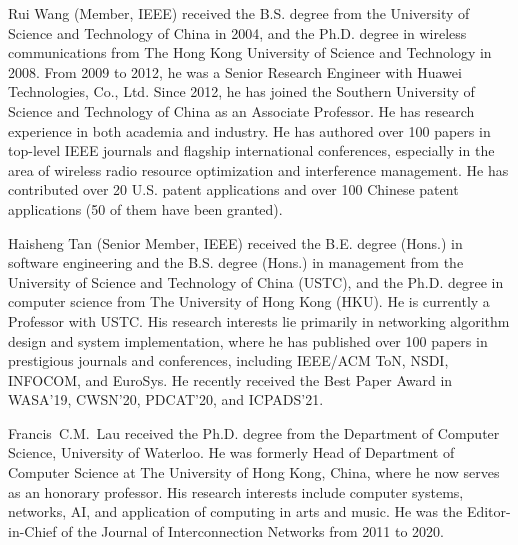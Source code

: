 \begin{IEEEbiography}{Rui Wang}
    (Member, IEEE) received the B.S. degree from the University of Science and Technology of China in 2004, and the Ph.D. degree in wireless communications from The Hong Kong University of Science and Technology in 2008.
	From 2009 to 2012, he was a Senior Research Engineer with Huawei Technologies, Co., Ltd.
	Since 2012, he has joined the Southern University of Science and Technology of China as an Associate Professor.
	He has research experience in both academia and industry.
	He has authored over 100 papers in top-level IEEE journals and flagship international conferences, especially in the area of wireless radio resource optimization and interference management.
	He has contributed over 20 U.S. patent applications and over 100 Chinese patent applications (50 of them have been granted).
\end{IEEEbiography}
\vspace{-1cm}

\begin{IEEEbiography}{Haisheng Tan}
    (Senior Member, IEEE) received the B.E. degree (Hons.) in software engineering and the B.S. degree (Hons.) in management from the University of Science and Technology of China (USTC), and the Ph.D. degree in computer science from The University of Hong Kong (HKU).
	He is currently a Professor with USTC.
	His research interests lie primarily in networking algorithm design and system implementation, where he has published over 100 papers in prestigious journals and conferences, including IEEE/ACM ToN, NSDI, INFOCOM, and EuroSys.
	He recently received the Best Paper Award in WASA'19, CWSN'20, PDCAT'20, and ICPADS'21.
\end{IEEEbiography}
\vspace{-1cm}

\begin{IEEEbiography}{Francis~C.M.~Lau}
    received the Ph.D. degree from the Department of Computer Science, University of Waterloo.
	He was formerly Head of Department of Computer Science at The University of Hong Kong, China, where he now serves as an honorary professor.
	His research interests include computer systems, networks, AI, and application of computing in arts and music.
	He was the Editor-in-Chief of the Journal of Interconnection Networks from 2011 to 2020.
\end{IEEEbiography}
\vspace{-1cm}
